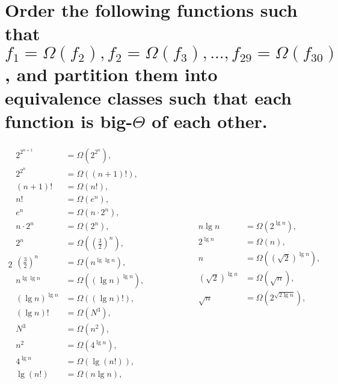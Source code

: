 \section[Problem 6]{Order the following functions such that $f_1 = \Omega(f_2), f_2 = \Omega(f_3), ..., f_{29} = \Omega(f_{30})$, and partition them into equivalence classes such that each function is big-$\Theta$ of each other.}

\begin{alignat*}{2}
	\begin{aligned}
		2^{2^{n + 1}} &= \Omega \left(2^{2^n} \right), \\
		2^{2^n} &= \Omega \left((n + 1)! \right), \\
		(n + 1)! &= \Omega \left(n! \right), \\
		n! &= \Omega \left(e^n \right), \\
		e^n &= \Omega \left(n \cdot 2^n \right), \\
		n \cdot 2^n &= \Omega \left(2^n \right), \\
		2^n &= \Omega \left(\left( \frac{3}{2} \right)^n \right), \\
		\left( \frac{3}{2} \right)^n &= \Omega \left(n^{\lg \lg n} \right), \\
		n^{\lg \lg n} &= \Omega \left(\left( \lg n \right)^{\lg n} \right), \\
		\left( \lg n \right)^{\lg n} &= \Omega \left((\lg n)! \right), \\
		(\lg n)! &= \Omega \left(N^3 \right), \\
		N^3 &= \Omega \left(n^2 \right), \\
		n^2 &= \Omega \left(4^{\lg n} \right), \\
		4^{\lg n} &= \Omega \left(\lg (n!) \right), \\
		\lg (n!)  &= \Omega \left(n \lg n \right), \\
	\end{aligned}
	& \qquad \qquad &
	\begin{aligned}
		n \lg n &= \Omega \left(2^{\lg n} \right), \\
		2^{\lg n} &= \Omega \left(n \right), \\
		n &= \Omega \left(\left( \sqrt{2} \right)^{\lg n} \right), \\
		\left( \sqrt{2} \right)^{\lg n} &= \Omega \left(\sqrt{n} \right), \\
		\sqrt{n} &= \Omega \left(2^{\sqrt{2 \lg n}} \right), \\

\end{aligned}
\end{alignat*}
